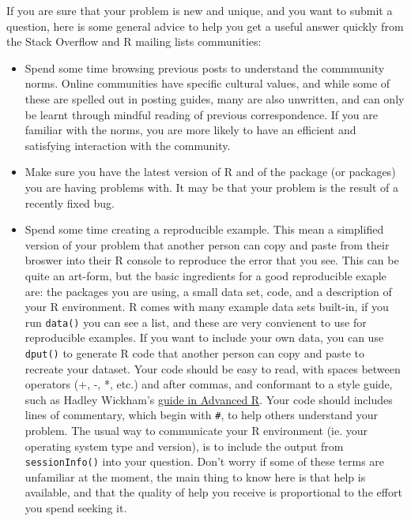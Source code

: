 If you are sure that your problem is new and unique, and you want to
submit a question, here is some general advice to help you get a useful
answer quickly from the Stack Overflow and R mailing lists communities:

\begin{itemize}
\item
  Spend some time browsing previous posts to understand the commmunity
  norms. Online communities have specific cultural values, and while
  some of these are spelled out in posting guides, many are also
  unwritten, and can only be learnt through mindful reading of previous
  correspondence. If you are familiar with the norms, you are more
  likely to have an efficient and satisfying interaction with the
  community.
\item
  Make sure you have the latest version of R and of the package (or
  packages) you are having problems with. It may be that your problem is
  the result of a recently fixed bug.
\item
  Spend some time creating a reproducible example. This mean a
  simplified version of your problem that another person can copy and
  paste from their broswer into their R console to reproduce the error
  that you see. This can be quite an art-form, but the basic ingredients
  for a good reproducible exaple are: the packages you are using, a
  small data set, code, and a description of your R environment. R comes
  with many example data sets built-in, if you run \texttt{data()} you
  can see a list, and these are very convienent to use for reproducible
  examples. If you want to include your own data, you can use
  \texttt{dput()} to generate R code that another person can copy and
  paste to recreate your dataset. Your code should be easy to read, with
  spaces between operators (+, -, *, etc.) and after commas, and
  conformant to a style guide, such as Hadley Wickham's
  \href{http://adv-r.had.co.nz/Style.html}{guide in Advanced R}. Your
  code should includes lines of commentary, which begin with
  \texttt{\#}, to help others understand your problem. The usual way to
  communicate your R environment (ie. your operating system type and
  version), is to include the output from \texttt{sessionInfo()} into
  your question. Don't worry if some of these terms are unfamiliar at
  the moment, the main thing to know here is that help is available, and
  that the quality of help you receive is proportional to the effort you
  spend seeking it.
\end{itemize}


